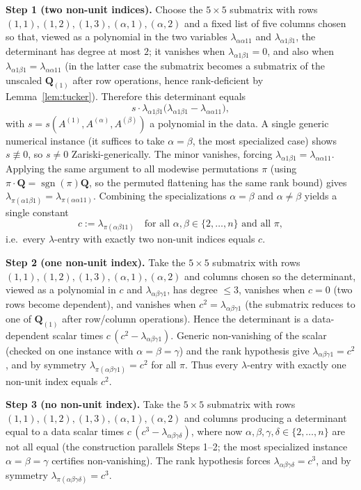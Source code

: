 \documentclass[11pt]{article}
\newcommand{\sgn}{\operatorname{sgn}}
\newcommand{\bQ}{\mathbf{Q}}
\begin{document}
\medskip
\noindent\textbf{Step 1 (two non-unit indices).}
Choose the $5\times5$ submatrix with rows $(1,1),(1,2),(1,3),(\alpha,1),(\alpha,2)$
and a fixed list of five columns chosen so that, viewed as a polynomial in the
two variables $\lambda_{\alpha\alpha11}$ and $\lambda_{\alpha1\beta1}$, the
determinant has degree at most $2$; it vanishes when $\lambda_{\alpha1\beta1}=0$,
and also when $\lambda_{\alpha1\beta1}=\lambda_{\alpha\alpha11}$ (in the latter
case the submatrix becomes a submatrix of the unscaled $\bQ_{(1)}$ after row
operations, hence rank-deficient by Lemma~\ref{lem:tucker}). Therefore this
determinant equals
\[
  s\cdot\lambda_{\alpha1\beta1}\bigl(\lambda_{\alpha1\beta1}-\lambda_{\alpha\alpha11}\bigr),
\]
with $s=s(A^{(1)},A^{(\alpha)},A^{(\beta)})$ a polynomial in the data. A single
generic numerical instance (it suffices to take $\alpha=\beta$, the most
specialized case) shows $s\not\equiv0$, so $s\ne0$ Zariski-generically. The
minor vanishes, forcing $\lambda_{\alpha1\beta1}=\lambda_{\alpha\alpha11}$.
Applying the same argument to all modewise permutations $\pi$ (using
$\pi\cdot\bQ=\sgn(\pi)\bQ$, so the permuted flattening has the same rank bound)
gives $\lambda_{\pi(\alpha1\beta1)}=\lambda_{\pi(\alpha\alpha11)}$. Combining the
specializations $\alpha=\beta$ and $\alpha\ne\beta$ yields a single constant
\[
  c:=\lambda_{\pi(\alpha\beta11)}\quad\text{for all }\alpha,\beta\in\{2,\dots,n\}\text{ and all }\pi,
\]
i.e.\ every $\lambda$-entry with exactly two non-unit indices equals $c$.

\medskip
\noindent\textbf{Step 2 (one non-unit index).}
Take the $5\times5$ submatrix with rows $(1,1),(1,2),(1,3),(\alpha,1),(\alpha,2)$
and columns chosen so the determinant, viewed as a polynomial in $c$ and
$\lambda_{\alpha\beta\gamma1}$, has degree $\le3$, vanishes when $c=0$ (two rows
become dependent), and vanishes when $c^{2}=\lambda_{\alpha\beta\gamma1}$ (the
submatrix reduces to one of $\bQ_{(1)}$ after row/column operations). Hence the
determinant is a data-dependent scalar times $c\,(c^{2}-\lambda_{\alpha\beta\gamma1})$.
Generic non-vanishing of the scalar (checked on one instance with
$\alpha=\beta=\gamma$) and the rank hypothesis give
$\lambda_{\alpha\beta\gamma1}=c^{2}$, and by symmetry
$\lambda_{\pi(\alpha\beta\gamma1)}=c^{2}$ for all $\pi$. Thus every $\lambda$-entry
with exactly one non-unit index equals $c^{2}$.

\medskip
\noindent\textbf{Step 3 (no non-unit index).}
Take the $5\times5$ submatrix with rows $(1,1),(1,2),(1,3),(\alpha,1),(\alpha,2)$
and columns producing a determinant equal to a data scalar times
$c\,(c^{3}-\lambda_{\alpha\beta\gamma\delta})$, where now
$\alpha,\beta,\gamma,\delta\in\{2,\dots,n\}$ are not all equal (the construction
parallels Steps 1–2; the most specialized instance $\alpha=\beta=\gamma$ certifies
non-vanishing). The rank hypothesis forces $\lambda_{\alpha\beta\gamma\delta}=c^{3}$,
and by symmetry $\lambda_{\pi(\alpha\beta\gamma\delta)}=c^{3}$.
\end{document}
